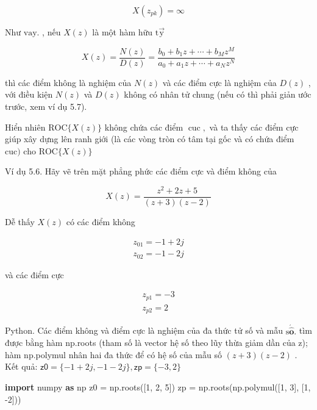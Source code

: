 \documentclass[
  10
]{article}
\newenvironment{Shaded}{}{}
\newcommand{\DecValTok}[1]{\textcolor[rgb]{0.25,0.63,0.44}{#1}}
\newcommand{\ImportTok}[1]{\textcolor[rgb]{0.00,0.50,0.00}{\textbf{#1}}}
\newcommand{\NormalTok}[1]{#1}
\newcommand{\OperatorTok}[1]{\textcolor[rgb]{0.40,0.40,0.40}{#1}}
\begin{document}
\[
X (z _ {p k}) = \infty
\]

Như \(\mathrm { v a y } .\) , nếu \(X ( z )\) là một hàm hữu
\(\mathrm { t \vec { y } }\)

\[
X (z) = \frac {N (z)}{D (z)} = \frac {b _ {0} + b _ {1} z + \cdots + b _ {M} z ^ {M}}{a _ {0} + a _ {1} z + \cdots + a _ {N} z ^ {N}}
\]

thì các điểm không là nghiệm của \(N ( z )\) và các điểm cực là nghiệm
của \(D ( z )\) , với điều kiện \(N ( z )\) và \(D ( z )\) không có nhân
tử chung (nếu có thì phải giản ước trước, xem ví dụ 5.7).

Hiển nhiên \(\mathrm { R O C } \{ X ( z ) \}\) không chứa các điểm
\(\operatorname { c u c } ,\) và ta thấy các điểm cực giúp xây dựng lên
ranh giới (là các vòng tròn có tâm tại gốc và có chứa điểm
\(\mathrm { c u c } )\) cho \(\mathrm { R O C } \{ X ( z ) \}\)

Ví dụ 5.6. Hãy vẽ trên mặt phẳng phức các điểm cực và điểm không của

\[
X (z) = \frac {z ^ {2} + 2 z + 5}{(z + 3) (z - 2)}
\]

Dễ thấy \(X ( z )\) có các điểm không

\[
\begin{array}{r} z _ {0 1} = - 1 + 2 j \\ z _ {0 2} = - 1 - 2 j \end{array}
\]

và các điểm cực

\[
\begin{array}{c} {z _ {p 1} = - 3} \\ {z _ {p 2} = 2} \end{array}
\]

Python. Các điểm không và điểm cực là nghiệm của đa thức tử số và mẫu
\({ \mathrm { s } } { \acute { \hat { \mathbf { o } } } } .\) tìm được
bằng hàm np.roots (tham số là vector hệ số theo lũy thừa giảm dần của
z); hàm np.polymul nhân hai đa thức để có hệ số của mẫu số
\(( z + 3 ) ( z - 2 )\) . Kết quả:
\(\mathsf { z 0 } = \{ - 1 + 2 j , - 1 - 2 j \} , \mathsf { z p } = \{ - 3 , 2 \}\)

\begin{Shaded}
\begin{Highlighting}[]
\ImportTok{import}\NormalTok{ numpy }\ImportTok{as}\NormalTok{ np}
\NormalTok{z0 }\OperatorTok{=}\NormalTok{ np.roots([}\DecValTok{1}\NormalTok{, }\DecValTok{2}\NormalTok{, }\DecValTok{5}\NormalTok{])}
\NormalTok{zp }\OperatorTok{=}\NormalTok{ np.roots(np.polymul([}\DecValTok{1}\NormalTok{, }\DecValTok{3}\NormalTok{], [}\DecValTok{1}\NormalTok{, }\OperatorTok{{-}}\DecValTok{2}\NormalTok{])) }
\end{Highlighting}
\end{Shaded}
\end{document}
